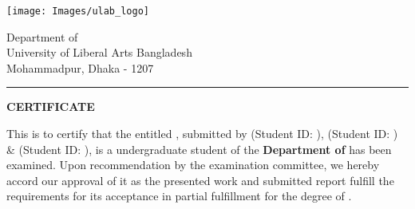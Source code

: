 \thispagestyle{plain}
\begin{minipage}{0.37\textwidth}
\texttt{[image: Images/ulab\_logo]}
\end{minipage}
\begin{minipage}{0.63\textwidth}
 Department of \Department \\
 University of Liberal Arts Bangladesh \\
 Mohammadpur, Dhaka - 1207
\end{minipage}

\vspace{0.1\baselineskip}
\hrule
\vspace{.1\baselineskip}
\begin{center}
{\Large {\bf \uppercase{Certificate}}}
\end{center}


\noindent 
This is to certify that the \MakeTextLowercase{\RoportType} entitled {\bf \ReportTitle}, submitted by {\bf \firstAuthor} (Student ID: {\firstAuthorID}), {\bf \secondAuthor} (Student ID: {\secondAuthorID}) \& {\bf \thirdAuthor} (Student ID: {\thirdAuthorID}), is a undergraduate student of the {\bf Department of \Department} has been examined. Upon recommendation by the examination committee, we hereby accord our approval of it as the presented work and submitted report fulfill the requirements for its acceptance in partial fulfillment for the degree of \emph{\Degree}. 

\noindent


